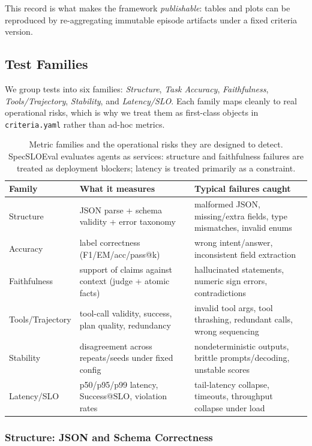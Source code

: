 \documentclass[11pt]{article}
\newcommand{\slo}{\ensuremath{\mathrm{SLO}}}
\begin{document}
This record is what makes the framework \emph{publishable}: tables and plots can be reproduced by re-aggregating immutable episode artifacts under a fixed criteria version.

\subsection{Test Families}
\label{sec:test-families}

We group tests into six families: \emph{Structure}, \emph{Task Accuracy}, \emph{Faithfulness}, \emph{Tools/Trajectory}, \emph{Stability}, and \emph{Latency/SLO}.
Each family maps cleanly to real operational risks, which is why we treat them as first-class objects in \texttt{criteria.yaml} rather than ad-hoc metrics.

\begin{table}[t]
\centering
\small
\begin{tabular}{@{}p{2.4cm}p{5.3cm}p{5.2cm}@{}}
\toprule
\textbf{Family} & \textbf{What it measures} & \textbf{Typical failures caught} \\
\midrule
Structure & JSON parse + schema validity + error taxonomy & malformed JSON, missing/extra fields, type mismatches, invalid enums \\
Accuracy & label correctness (F1/EM/acc/pass@k) & wrong intent/answer, inconsistent field extraction \\
Faithfulness & support of claims against context (judge + atomic facts) & hallucinated statements, numeric sign errors, contradictions \\
Tools/Trajectory & tool-call validity, success, plan quality, redundancy & invalid tool args, tool thrashing, redundant calls, wrong sequencing \\
Stability & disagreement across repeats/seeds under fixed config & nondeterministic outputs, brittle prompts/decoding, unstable scores \\
Latency/SLO & p50/p95/p99 latency, Success@\slo, violation rates & tail-latency collapse, timeouts, throughput collapse under load \\
\bottomrule
\end{tabular}
\caption{Metric families and the operational risks they are designed to detect.
SpecSLOEval evaluates agents as services: structure and faithfulness failures are treated as deployment blockers; latency is treated primarily as a constraint.}
\label{tab:families}
\end{table}

\subsubsection{Structure: JSON and Schema Correctness}
\end{document}
